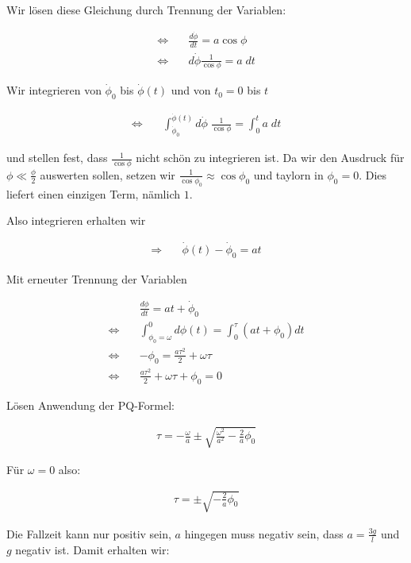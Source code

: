 \documentclass[a4paper,german,12pt,smallheadings]{scrartcl}
\begin{document}
Wir lösen diese Gleichung durch Trennung der Variablen:

\begin{align*}
  \Leftrightarrow\quad&\frac{d \dot{\phi}}{dt} = a \cos \phi\\
  \Leftrightarrow\quad&d \dot{\phi} \frac{1}{\cos \phi} = a \; dt
\end{align*}

Wir integrieren von $\dot{\phi}_0$ bis $\dot{\phi}(t)$ und von $t_0 = 0$ bis $t$

\begin{align*}
  \Leftrightarrow\quad&\int_{\dot{\phi}_0}^{\dot{\phi}(t)} d \dot{\phi} \; \frac{1}{\cos \phi} = \int_0^{t} a \; dt
\end{align*}

und stellen fest, dass $\frac{1}{\cos \phi}$ nicht schön zu integrieren ist. Da
wir den Ausdruck für $\phi \ll \frac{\phi}{2}$ auswerten sollen, setzen wir
$\frac{1}{\cos \phi_0} \approx \cos \phi_0$ und taylorn in $\phi_0 = 0$. Dies
liefert einen einzigen Term, nämlich $1$.

Also integrieren erhalten wir

\begin{align*}
  \Rightarrow\quad&\dot{\phi}(t) -\dot{\phi}_0 = at
\end{align*}

Mit erneuter Trennung der Variablen

\begin{align*}
  &\frac{d \phi}{dt} = at + \dot{\phi}_0\\
  \Leftrightarrow\quad& \int_{\phi_0 = \omega}^{0} d\phi(t) = \int_0^{\tau}(at + \phi_0) dt\\
  \Leftrightarrow\quad& -\phi_0 = \frac{a \tau^2}{2} + \omega \tau \\
  \Leftrightarrow\quad& \frac{a \tau^2}{2} + \omega \tau + \phi_0 = 0
\end{align*}

Lösen Anwendung der PQ-Formel:

\begin{align*}
  \tau = -\frac{\omega}{a} \pm \sqrt{\frac{\omega^2}{a^2} - \frac{2}{a} \phi_0}
\end{align*}

Für $\omega = 0$ also:

\begin{align*}
  \tau = \pm \sqrt{- \frac{2}{a} \phi_0}
\end{align*}

Die Fallzeit kann nur positiv sein, $a$ hingegen muss negativ sein, dass $a = \frac{3g}{l}$ und $g$ negativ ist. Damit erhalten wir:
\end{document}
